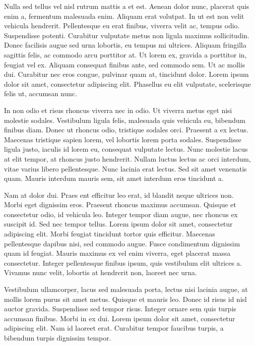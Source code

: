 \documentclass[
  12pt,
  a4paper,
  oneside]{book}
\begin{document}
Nulla sed tellus vel nisl rutrum mattis a et est. Aenean dolor nunc, placerat quis enim a, fermentum malesuada enim. Aliquam erat volutpat. In ut est non velit vehicula hendrerit. Pellentesque eu erat finibus, viverra velit ac, tempus odio. Suspendisse potenti. Curabitur vulputate metus non ligula maximus sollicitudin. Donec facilisis augue sed urna lobortis, eu tempus mi ultrices. Aliquam fringilla sagittis felis, ac commodo arcu porttitor at. Ut lorem ex, gravida a porttitor in, feugiat vel ex. Aliquam consequat finibus ante, sed commodo sem. Ut ac mollis dui. Curabitur nec eros congue, pulvinar quam at, tincidunt dolor. Lorem ipsum dolor sit amet, consectetur adipiscing elit. Phasellus eu elit vulputate, scelerisque felis ut, accumsan nunc.

In non odio et risus rhoncus viverra nec in odio. Ut viverra metus eget nisi molestie sodales. Vestibulum ligula felis, malesuada quis vehicula eu, bibendum finibus diam. Donec ut rhoncus odio, tristique sodales orci. Praesent a ex lectus. Maecenas tristique sapien lorem, vel lobortis lorem porta sodales. Suspendisse ligula justo, iaculis id lorem eu, consequat vulputate lectus. Nunc molestie lacus at elit tempor, at rhoncus justo hendrerit. Nullam luctus lectus ac orci interdum, vitae varius libero pellentesque. Nunc lacinia erat lectus. Sed sit amet venenatis quam. Mauris interdum mauris sem, sit amet interdum eros tincidunt a.

Nam at dolor dui. Praes ent efficitur leo erat, id blandit neque ultrices non. Morbi eget dignissim eros. Praesent rhoncus maximus accumsan. Quisque et consectetur odio, id vehicula leo. Integer tempor diam augue, nec rhoncus ex suscipit id. Sed nec tempor tellus. Lorem ipsum dolor sit amet, consectetur adipiscing elit. Morbi feugiat tincidunt tortor quis efficitur. Maecenas pellentesque dapibus nisi, sed commodo augue. Fusce condimentum dignissim quam id feugiat. Mauris maximus ex vel enim viverra, eget placerat massa consectetur. Integer pellentesque finibus ipsum, quis vestibulum elit ultrices a. Vivamus nunc velit, lobortis at hendrerit non, laoreet nec urna.

Vestibulum ullamcorper, lacus sed malesuada porta, lectus nisi lacinia augue, at mollis lorem purus sit amet metus. Quisque et mauris leo. Donec id risus id nisl auctor gravida. Suspendisse sed tempor risus. Integer ornare sem quis turpis accumsan finibus. Morbi in ex dui. Lorem ipsum dolor sit amet, consectetur adipiscing elit. Nam id laoreet erat. Curabitur tempor faucibus turpis, a bibendum turpis dignissim tempor.
\end{document}
